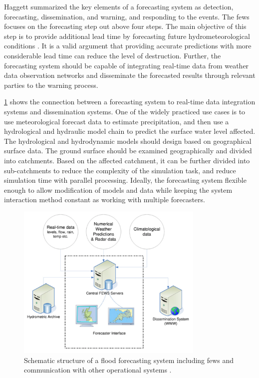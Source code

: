 Haggett \cite{Haggett1998AnWales} summarized the key elements of a forecasting system as detection, forecasting, dissemination, and warning, and responding to the events. The \acrshort{fews} focuses on the forecasting step out above four steps. The main objective of this step is to provide additional lead time by forecasting future hydrometeorological conditions \cite{Werner2005FloodCatchments}. It is a valid argument that providing accurate predictions with more considerable lead time can reduce the level of destruction. Further, the forecasting system should be capable of integrating real-time data from weather data observation networks and disseminate the forecasted results through relevant parties to the warning process.

\cref{fi:fews_schematic} shows the connection between a forecasting system to real-time data integration systems and dissemination systems. One of the widely practiced use cases is to use meteorological forecast data to estimate precipitation, and then use a hydrological and hydraulic model chain to predict the surface water level affected. The hydrological and hydrodynamic models should design based on geographical surface data. The ground surface should be examined geographically and divided into catchments. Based on the affected catchment, it can be further divided into sub-catchments to reduce the complexity of the simulation task, and reduce simulation time with parallel processing. Ideally, the forecasting system flexible enough to allow modification of models and data while keeping the system interaction method constant as working with multiple forecasters.

\begin{figure}[htp]
    \centering
    \includegraphics[width=0.8\textwidth]{lit/fews/Schematic-structure-of-a-fl-ood-forecasting-system-showing-the-position-of-Delft-FEWS_W640.png}
    \caption[Schematic structure of a flood forecasting system including \acrshort{fews} and communication among other operational systems]{Schematic structure of a flood forecasting system including \acrshort{fews} and communication with other operational systems \cite{Werner2013TheSystem}.}
    \label{fi:fews_schematic}
\end{figure}

